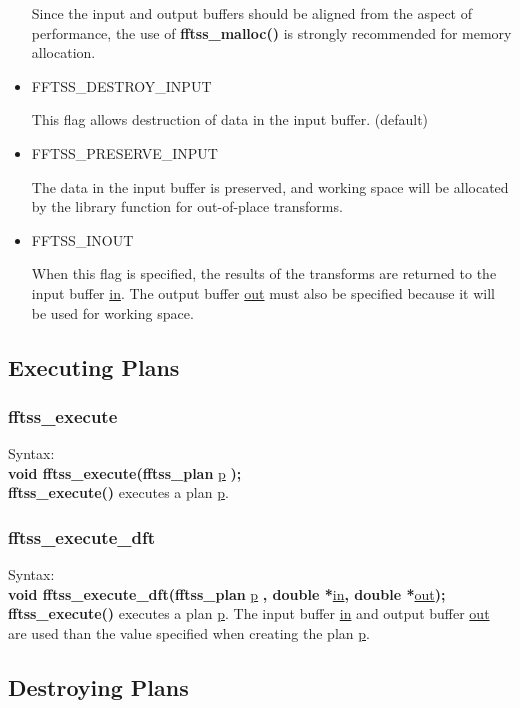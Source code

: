 \documentclass{article}
\begin{document}
\begin{itemize}
Since the input and output buffers should be aligned
 from the aspect of performance, the use of {\bf fftss\_malloc()} is strongly 
recommended for memory allocation.

\item{FFTSS\_DESTROY\_INPUT}

This flag allows destruction of data in the input buffer. (default)

\item{FFTSS\_PRESERVE\_INPUT}

The data in the input buffer is preserved, and working space
will be allocated by the library function for out-of-place transforms.

\item{FFTSS\_INOUT}

When this flag is specified, the results of the transforms are returned to the input buffer \underline{in}. The output buffer \underline{out} must also be specified
because it will be used for working space.


\end{itemize}

\subsection{Executing Plans}

\subsubsection{fftss\_execute}
Syntax:\\
{\bf void fftss\_execute(fftss\_plan }\underline{p}
{\bf );}\\

{\bf fftss\_execute()} executes a plan \underline{p}.

\subsubsection{fftss\_execute\_dft}
Syntax:\\
{\bf void fftss\_execute\_dft(fftss\_plan }\underline{p}
{\bf , double *}\underline{in}{\bf , double *}\underline{out}{\bf );}\\

{\bf fftss\_execute()} executes a plan \underline{p}.
The input buffer \underline{in} and output buffer \underline{out} are
used than the value specified when creating the plan \underline{p}.

\subsection{Destroying Plans}
\end{document}
